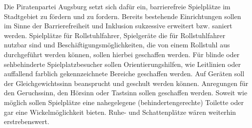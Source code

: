   Die Piratenpartei Augsburg setzt sich dafür ein, barrierefreie 
  Spielplätze 
  im Stadtgebiet zu fördern und zu fordern. Bereits bestehende 
  Einrichtungen 
  sollen im Sinne der Barrierefreiheit und Inklusion sukzessive 
  erweitert bzw. 
  saniert werden. Spielplätze für Rollstuhlfahrer, Spielgeräte die 
  für 
  Rollstuhlfahrer nutzbar sind und Beschäftigungsmöglichkeiten, die 
  von einem 
  Rollstuhl aus durchgeführt werden können, sollen hierbei geschaffen 
  werden. 
  Für blinde oder sehbehinderte Spielplatzbesucher sollen 
  Orientierungshilfen,
  wie Leitlinien oder auffallend farblich gekennzeichnete Bereiche 
  geschaffen 
  werden. Auf Geräten soll der Gleichgewichtssinn beansprucht und 
  geschult 
  werden können. Anregungen für den Geruchssinn, den Hörsinn oder 
  Tastsinn 
  sollen geschaffen werden. Soweit wie möglich sollen Spielplätze 
  eine 
  nahegelegene (behindertengerechte) Toilette oder gar eine 
  Wickelmöglichkeit 
  bieten. Ruhe- und Schattenplätze wären weiterhin erstrebenswert.